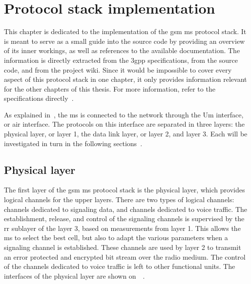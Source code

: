\chapter{Protocol stack implementation}
\label{chap:protocol_stack_implementation}

This chapter is dedicated to the  implementation of the
\gls{gsm} \gls{ms} protocol stack. It is meant to serve as a small guide
into the source code by providing an overview of its inner workings, as
well as references to the available documentation. The information is
directly extracted from the \gls{3gpp} specifications, from the source
code, and from the project wiki. Since it would be impossible to cover
every aspect of this protocol stack in one chapter, it only provides
information relevant for the other chapters of this thesis. For more
information, refer to the specifications
directly~\cite{3gpp_specifications_????,osmocombb_ms-side_????,osmocombb_2015}.

As explained in~, the \gls{ms} is
connected to the network through the Um interface, or air interface. The
protocols on this interface are separated in three layers: the physical
layer, or layer 1, the data link layer, or layer 2, and layer 3.
Each will be investigated in turn in the following
sections~\cite{3gpp_ts_2014-2}.

\section{Physical layer}

  The first layer of the \gls{gsm} \gls{ms} protocol stack is the
  physical layer, which provides logical channels for the upper layers.
  There are two types of logical channels: channels dedicated to
  signaling data, and channels dedicated to voice traffic. The
  establishment, release, and control of the signaling channels is
  supervised by the \gls{rr} sublayer of the layer 3, based on
  measurements from layer 1. This allows the \gls{ms} to select the best
  cell, but also to adapt the various parameters when a signaling
  channel is established. These channels are used by layer 2 to transmit
  an error protected and encrypted bit stream over the radio medium. The
  control of the channels dedicated to voice traffic is left to other
  functional units. The interfaces of the physical layer are shown
  on~~\cite{3gpp_ts_2014-4}.

